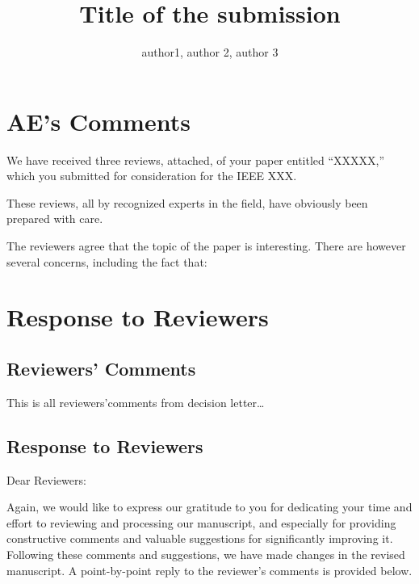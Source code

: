 \documentclass{ar2rc}
\title{Title of the submission}
\author{author1, author 2, author 3}
\begin{document}

\maketitle

\tableofcontents
\newpage

\section{AE's Comments}
We have received three reviews, attached, of your paper entitled 
``XXXXX,'' 
which you submitted for consideration for the IEEE XXX.

These reviews, all by recognized experts in the field, have obviously been prepared with care.

The reviewers agree that the topic of the paper is interesting. There are however several concerns, including the fact that:


\begin{AR}
    \blindtext
\end{AR}

\newpage



\section{Response to Reviewers}
\subsection{Reviewers' Comments}
This is all reviewers'comments from decision letter\dots
\blindtext


\subsection{Response to Reviewers}
\noindent Dear Reviewers:

Again, we would like to express our gratitude to you for dedicating your time and effort to reviewing and processing our manuscript,
and especially for providing constructive comments and valuable suggestions for significantly improving it.
Following these comments and suggestions,
we have made changes in the revised manuscript.
A point-by-point reply to the reviewer's comments is provided below.


\setcounter{reviewer}{0}
\reviewersection
\end{document}
